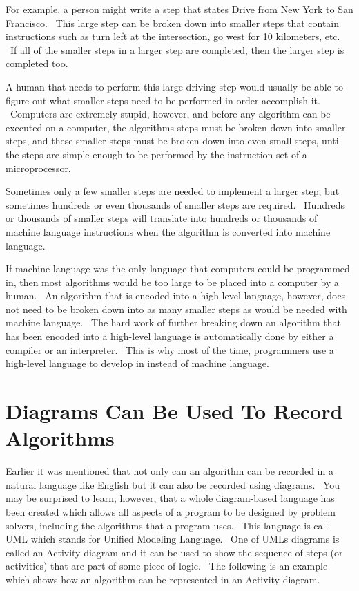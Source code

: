\documentclass[12pt,twoside]{book}
\begin{document}
\bigskip

For example, a person might write a step that states {\textquotedbl}Drive from New York to San Francisco.{\textquotedbl} \ This large step can be broken down into smaller steps that contain instructions such as {\textquotedbl}turn left at the intersection, go west for 10 kilometers, etc.{\textquotedbl} \ If all of the smaller steps in a larger step are completed, then the larger step is completed too. 

\bigskip

A human that needs to perform this large driving step would usually be able to figure out what smaller steps need to be performed in order accomplish it. \ Computers are extremely stupid, however, and before any algorithm can be executed on a computer, the algorithm{\textquotesingle}s steps must be broken down into smaller steps, and these smaller steps must be broken down into even small steps, until the steps are simple enough to be performed by the instruction set of a microprocessor. 

\bigskip

Sometimes only a few smaller steps are needed to implement a larger step, but sometimes hundreds or even thousands of smaller steps are required. \ Hundreds or thousands of smaller steps will translate into hundreds or thousands of machine language instructions when the algorithm is converted into machine language. 

\bigskip

If machine language was the only language that computers could be programmed in, then most algorithms would be too large to be placed into a computer by a human. \ An algorithm that is encoded into a high{}-level language, however, does not need to be broken down into as many smaller steps as would be needed with machine language. \ The hard work of further breaking down an algorithm that has been encoded into a high{}-level language is automatically done by either a compiler or an interpreter. \ This is why most of the time, programmers use a high{}-level language to develop in instead of machine language.

\section[Diagrams Can Be Used To Record Algorithms]{ Diagrams Can Be Used To Record Algorithms}

Earlier it was mentioned that not only can an algorithm can be recorded in a natural language like English but it can also be recorded using diagrams. \ You may be surprised to learn, however, that a whole diagram{}-based language has been created which allows all aspects of a program to be designed by {\textquotesingle}problem solvers{\textquotesingle}, including the algorithms that a program uses. \ This language is call UML which stands for Unified Modeling Language. \ One of UML{\textquotesingle}s diagrams is called an Activity diagram and it can be used to show the sequence of steps (or activities) that are part of some piece of logic. \ The following is an example which shows how an algorithm can be represented in an Activity diagram.
\end{document}
